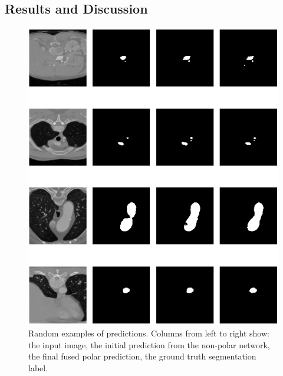 \subsection{Results and Discussion}

\begin{figure}[h!]
\centering
\includegraphics[width=\columnwidth]{images/4/examples_3}
\caption{Random examples of predictions. Columns from left to right show: the input image, the initial prediction from the non-polar network, the final fused polar prediction, the ground truth segmentation label.}
\label{fig:examples}
\end{figure}
\clearpage

